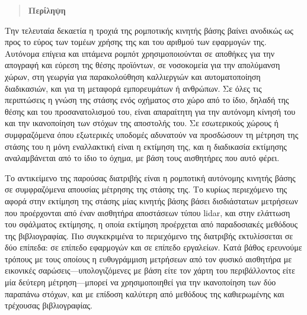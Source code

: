 \singlespace

\vfill
\begin{quotation}
\begin{center}
\textbf{Περίληψη}
\end{center}
\noindent
\end{quotation}

Την τελευταία δεκαετία η τροχιά της ρομποτικής κινητής βάσης βαίνει ανοδικώς ως
προς το εύρος των τομέων χρήσης της και του αριθμού των εφαρμογών της. Αυτόνομα
επίγεια και ιπτάμενα ρομπότ χρησιμοποιούνται σε αποθήκες για την απογραφή και
εύρεση της θέσης προϊόντων, σε νοσοκομεία για την απολύμανση χώρων, στη γεωργία
για παρακολούθηση καλλιεργιών και αυτοματοποίηση διαδικασιών, και για τη
μεταφορά εμπορευμάτων ή ανθρώπων. Σε όλες τις περιπτώσεις η γνώση της στάσης
ενός οχήματος στο χώρο από το ίδιο, δηλαδή της θέσης και του προσανατολισμού
του, είναι απαραίτητη για την αυτόνομη κίνησή του και την ικανοποίηση των
στόχων της αποστολής του. Σε εσωτερικούς χώρους ή συμφραζόμενα όπου εξωτερικές
υποδομές αδυνατούν να προσδώσουν τη μέτρηση της στάσης του η μόνη εναλλακτική
είναι η εκτίμηση της, και η διαδικασία εκτίμησης αναλαμβάνεται από το ίδιο το
όχημα, με βάση τους αισθητήρες που αυτό φέρει.

Το αντικείμενο της παρούσας διατριβής είναι η ρομποτική αυτόνομης κινητής βάσης
σε συμφραζόμενα απουσίας μέτρησης της στάσης της. Το κυρίως περιεχόμενο της
αφορά στην εκτίμηση της στάσης μίας κινητής βάσης βάσει δισδιάστατων μετρήσεων
που προέρχονται από έναν αισθητήρα αποστάσεων τύπου lidar, και στην ελάττωση του
σφάλματος εκτίμησης, η οποία εκτίμηση προέρχεται από παραδοσιακές μεθόδους της
βιβλιογραφίας. Πιο συγκεκριμένα το περιεχόμενο της διατριβής εκτυλίσσεται σε
δύο επίπεδα: σε επίπεδο εφαρμογών και σε επίπεδο εργαλείων.  Κατά βάθος
ερευνούμε τρόπους με τους οποίους η ευθυγράμμιση μετρήσεων από τον φυσικό
αισθητήρα με εικονικές σαρώσεις---υπολογιζόμενες με βάση είτε τον χάρτη του
περιβάλλοντος είτε μία δεύτερη μέτρηση---μπορεί να χρησιμοποιηθεί για την
ικανοποίηση των δύο παραπάνω στόχων, και με επίδοση καλύτερη από μεθόδους της
καθιερωμένης και τρέχουσας βιβλιογραφίας.

